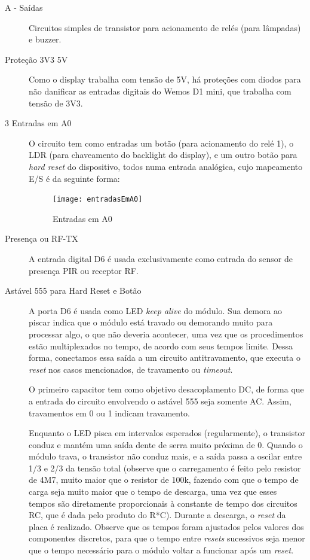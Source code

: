 \begin{description}
\item [A - Saídas] Circuitos simples de transistor para acionamento de relés (para lâmpadas) e buzzer.
\item [Proteção 3V3 5V] Como o display trabalha com tensão de 5V, há proteções com diodos para não danificar as entradas digitais do Wemos D1 mini, que trabalha com tensão de 3V3.
\item [3 Entradas em A0] O circuito tem como entradas um botão (para acionamento do relé 1), o LDR (para chaveamento do backlight do display), e um outro botão para \emph{hard reset} do dispositivo, todos numa entrada analógica, cujo mapeamento E/S é da seguinte forma:

\begin{figure}[H]
	\centering
	\caption{Entradas em A0}
  \texttt{[image: entradasEmA0]}
\label{fig:entradasEmA0}
\end{figure}

\item [Presença ou RF-TX] A entrada digital D6 é usada exclusivamente como entrada do sensor de presença PIR ou receptor RF.
\item [Astável 555 para Hard Reset e Botão] A porta D6 é usada como LED \textit{keep alive} do módulo. Sua demora ao piscar indica que o módulo está travado ou demorando muito para processar algo, o que não deveria acontecer, uma vez que os procedimentos estão multiplexados no tempo, de acordo com seus tempos limite. Dessa forma, conectamos essa saída a um circuito antitravamento, que executa o \emph{reset} nos casos mencionados, de travamento ou \textit{timeout}.

O primeiro capacitor tem como objetivo desacoplamento DC, de forma que a entrada do circuito envolvendo o astável 555 seja somente AC. Assim, travamentos em 0 ou 1 indicam travamento.

Enquanto o LED pisca em intervalos esperados (regularmente), o transistor conduz e mantém uma saída dente de serra muito próxima de 0. Quando o módulo trava, o transistor não conduz mais, e a saída passa a oscilar entre 1/3 e 2/3 da tensão total (observe que o carregamento é feito pelo resistor de 4M7, muito maior que o resistor de 100k, fazendo com que o tempo de carga seja muito maior que o tempo de descarga, uma vez que esses tempos são diretamente proporcionais à constante de tempo dos circuitos RC, que é dada pelo produto do R*C). Durante a descarga, o \emph{reset} da placa é realizado. Observe que os tempos foram ajustados pelos valores dos componentes discretos, para que o tempo entre \emph{resets} sucessivos seja menor que o tempo necessário para o módulo voltar a funcionar após um \emph{reset}.


\end{description}
